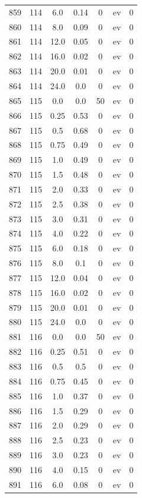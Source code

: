 \documentclass[12pt,a4paper]{article}
\begin{document}
\begin{tabular}{r|cccccc}
	859 & 114 & 6.0 & 0.14 & 0 & ev & 0 \\
	860 & 114 & 8.0 & 0.09 & 0 & ev & 0 \\
	861 & 114 & 12.0 & 0.05 & 0 & ev & 0 \\
	862 & 114 & 16.0 & 0.02 & 0 & ev & 0 \\
	863 & 114 & 20.0 & 0.01 & 0 & ev & 0 \\
	864 & 114 & 24.0 & 0.0 & 0 & ev & 0 \\
	865 & 115 & 0.0 & 0.0 & 50 & ev & 0 \\
	866 & 115 & 0.25 & 0.53 & 0 & ev & 0 \\
	867 & 115 & 0.5 & 0.68 & 0 & ev & 0 \\
	868 & 115 & 0.75 & 0.49 & 0 & ev & 0 \\
	869 & 115 & 1.0 & 0.49 & 0 & ev & 0 \\
	870 & 115 & 1.5 & 0.48 & 0 & ev & 0 \\
	871 & 115 & 2.0 & 0.33 & 0 & ev & 0 \\
	872 & 115 & 2.5 & 0.38 & 0 & ev & 0 \\
	873 & 115 & 3.0 & 0.31 & 0 & ev & 0 \\
	874 & 115 & 4.0 & 0.22 & 0 & ev & 0 \\
	875 & 115 & 6.0 & 0.18 & 0 & ev & 0 \\
	876 & 115 & 8.0 & 0.1 & 0 & ev & 0 \\
	877 & 115 & 12.0 & 0.04 & 0 & ev & 0 \\
	878 & 115 & 16.0 & 0.02 & 0 & ev & 0 \\
	879 & 115 & 20.0 & 0.01 & 0 & ev & 0 \\
	880 & 115 & 24.0 & 0.0 & 0 & ev & 0 \\
	881 & 116 & 0.0 & 0.0 & 50 & ev & 0 \\
	882 & 116 & 0.25 & 0.51 & 0 & ev & 0 \\
	883 & 116 & 0.5 & 0.5 & 0 & ev & 0 \\
	884 & 116 & 0.75 & 0.45 & 0 & ev & 0 \\
	885 & 116 & 1.0 & 0.37 & 0 & ev & 0 \\
	886 & 116 & 1.5 & 0.29 & 0 & ev & 0 \\
	887 & 116 & 2.0 & 0.29 & 0 & ev & 0 \\
	888 & 116 & 2.5 & 0.23 & 0 & ev & 0 \\
	889 & 116 & 3.0 & 0.23 & 0 & ev & 0 \\
	890 & 116 & 4.0 & 0.15 & 0 & ev & 0 \\
	891 & 116 & 6.0 & 0.08 & 0 & ev & 0 \\

\end{tabular}
\end{document}
